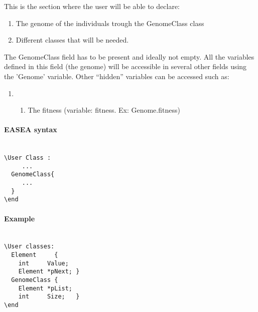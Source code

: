 \documentclass{book}
\begin{document}
This is the section where the user will be able to declare:

\begin{enumerate}
\itemsep1pt\parskip0pt
\item
  The genome of the individuals trough the GenomeClass class
\item
  Different classes that will be needed.
\end{enumerate}

The GenomeClass field has to be present and ideally not empty. All the
variables defined in this field (the genome) will be accessible in
several other fields using the 'Genome' variable. Other ``hidden''
variables can be accessed such as:

\begin{enumerate}
\item
  \begin{enumerate}
  \itemsep1pt\parskip0pt
  \item
    The fitness (variable: fitness. Ex: Genome.fitness)
  \end{enumerate}
\end{enumerate}

\paragraph{EASEA syntax}\label{easea-syntax-2}
~\\

\texttt{\textbackslash{}User~Class~:}\\\texttt{~~~~~...}\\\texttt{~~GenomeClass\{}\\\texttt{~~~~~...}\\\texttt{~~\}}\\\texttt{\textbackslash{}end}

\paragraph{Example}\label{example-2}
~\\

\texttt{\textbackslash{}User~classes:}\\\texttt{~~Element~~~~~\{~}\\\texttt{~~~~int~~~~~Value;}\\\texttt{~~~~Element~*pNext;~\}}\\\texttt{~~GenomeClass~\{~}\\\texttt{~~~~Element~*pList;~}\\\texttt{~~~~int~~~~~Size;~~~\}}\\\texttt{\textbackslash{}end}
\end{document}
